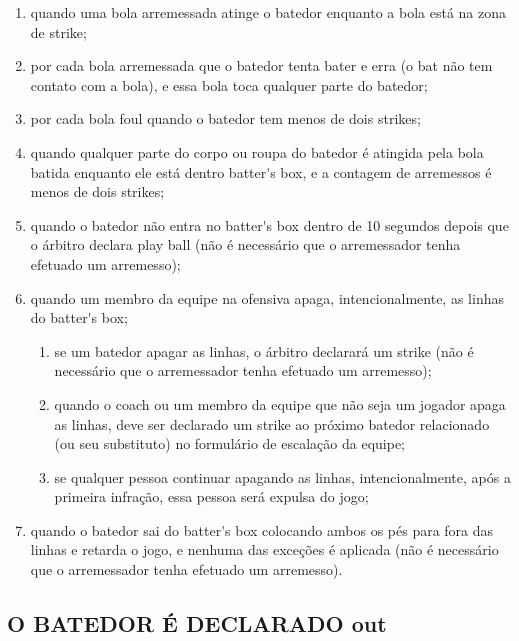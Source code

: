 \begin{multicols}{2}
\begin{enumerate}[label=\alph*)]
		\begin{enumerate}[label=\roman*.]
			\item quando uma bola arremessada atinge o batedor enquanto a bola est\'a na zona de \gls{strike}; 
			\item  por cada bola arremessada que o batedor tenta bater e erra (o \gls{bat} n\~ao tem contato com a bola), e essa bola toca qualquer parte do batedor; 
			\item por cada bola \gls{foul} quando o batedor tem menos de dois \glspl{strike}; 
			\item quando qualquer parte do corpo ou roupa do batedor \'e atingida pela bola batida enquanto ele est\'a dentro \gls{batter's box}, e a contagem de arremessos \'e menos de dois \glspl{strike}; 
			\item quando o batedor n\~ao entra no \gls{batter's box} dentro de 10 segundos depois que o \'arbitro declara \gls{play ball} (n\~ao \'e necess\'ario que o arremessador tenha efetuado um arremesso); 
			\item quando um membro da equipe na ofensiva apaga, intencionalmente, as linhas do \gls{batter's box}; 
			\begin{enumerate}[label=\arabic*)]
				\item  se um batedor apagar as linhas, o \'arbitro declarar\'a um \gls{strike} (n\~ao \'e necess\'ario que o arremessador tenha efetuado um arremesso); 
				
				\item quando o \gls{coach} ou um membro da equipe que n\~ao seja um jogador apaga as linhas, deve ser declarado um \gls{strike} ao pr\'oximo batedor relacionado (ou seu substituto) no formul\'ario de escala\c{c}\~ao da equipe; 
				
				\item se qualquer pessoa continuar apagando as linhas, intencionalmente, ap\'os a primeira infra\c{c}\~ao, essa pessoa ser\'a expulsa do jogo; 
			\end{enumerate}
			\item quando o batedor sai do \gls{batter's box} colocando ambos os p\'es para fora das linhas e retarda o jogo, e nenhuma das exce\c{c}\~oes \'e aplicada (n\~ao \'e necess\'ario que o arremessador tenha efetuado um arremesso). \end{enumerate}
	\end{enumerate}
	
	\subsection{O BATEDOR \'E DECLARADO \gls{out}}
	

\end{multicols}
